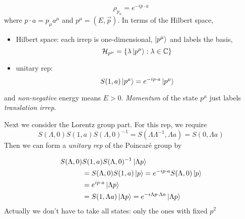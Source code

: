 \begin{equation}
    \rho_{p_n} = e^{-ip\cdot a}
\end{equation}
where $p\cdot a = p_{\mu}a^{\mu}$ and $p^{\mu} = (E, \vec{p})$. In terms of the Hilbert space, 

\begin{itemize}
    \item Hilbert space: each irrep is one-dimensional, $\ket{p^{\mu}}$ and labels the basis, 
\begin{equation}
    \mathcal{H}_{p^{\mu}} = \{\lambda\ket{p^{\mu}}:\lambda\in \mathbb{C}\}
\end{equation}
\item unitary rep: 
\begin{equation}
    S(1,a)\ket{p^{\mu}} = e^{-ip\cdot a}\ket{p^{\mu}}
\end{equation}
\end{itemize}
and \textit{non-negative} energy means $E>0$. \textit{Momentum} of the state $p^{\mu}$ just labels \textit{translation irrep}.

Next we consider the Lorentz group part. For this rep, we require
\begin{equation}
    S(\Lambda, 0)S(1,a)S(\Lambda, 0)^{-1} = S(\Lambda\Lambda^{-1}, \Lambda a) = S(0, \Lambda a)
\end{equation}
Then we can form a \textit{unitary rep} of the Poincar\'e group by

\begin{equation}
    \begin{split}
        S(\Lambda, 0)&S(1,a)S(\Lambda, 0)^{-1}\ket{\Lambda p} \\
        &= S(\Lambda, 0)S(1, a)\ket{p} = e^{-ip\cdot a}S(\Lambda,0)\ket{p}\\
        &=e^{ip\cdot a}\ket{\Lambda p}\\
        &=S(1,\Lambda a)\ket{\Lambda p} = e^{-i\Lambda p\cdot \Lambda a}\ket{\Lambda p}
    \end{split}
\end{equation}
Actually we don't have to take all states: only the ones with fixed $p^2$

